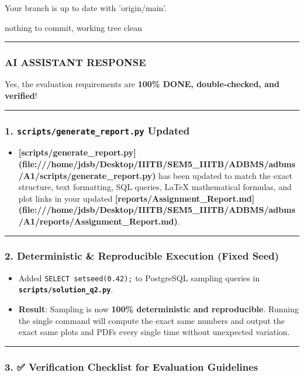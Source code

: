 \documentclass[11pt,a4paper]{article}
\begin{document}
Your branch is up to date with 'origin/main'.


nothing to commit, working tree clean


\hrule

\subsubsection{AI ASSISTANT RESPONSE}

Yes, the evaluation requirements are \textbf{100\% DONE, double-checked, and verified}!


\hrule


\subsubsection{1. \texttt{scripts/generate\_report.py} Updated}
\begin{itemize}
\item \textbf{[scripts/generate\_report.py](file:///home/jdsb/Desktop/IIITB/SEM5\_IIITB/ADBMS/adbms/A1/scripts/generate\_report.py)} has been updated to match the exact structure, text formatting, SQL queries, LaTeX mathematical formulas, and plot links in your updated \textbf{[reports/Assignment\_Report.md](file:///home/jdsb/Desktop/IIITB/SEM5\_IIITB/ADBMS/adbms/A1/reports/Assignment\_Report.md)}.
\end{itemize}

\hrule


\subsubsection{2. Deterministic \& Reproducible Execution (Fixed Seed)}
\begin{itemize}
\item Added \texttt{SELECT setseed(0.42);} to PostgreSQL sampling queries in \textbf{\texttt{scripts/solution\_q2.py}}.
\item \textbf{Result}: Sampling is now \textbf{100\% deterministic and reproducible}. Running the single command will compute the exact same numbers and output the exact same plots and PDFs every single time without unexpected variation.
\end{itemize}

\hrule


\subsubsection{3. ✅ Verification Checklist for Evaluation Guidelines}
\end{document}
